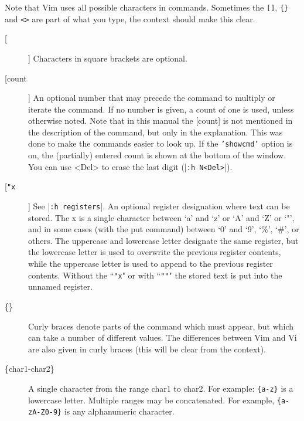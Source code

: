 Note that Vim uses all possible characters in commands.
Sometimes the \texttt{[]}, \texttt{\{\}} and \texttt{<>} are part of what you type, the context should make this clear.

\begin{description}
				\item[[]]
								Characters in square brackets are optional.

				\item[[count]]
								\label{count} \label{[count]}
								An optional number that may precede the command to multiply or iterate the command.
								If no number is given, a count of one is used, unless otherwise noted.
								Note that in this manual the [count] is not mentioned in the description of the command, but only in the explanation.
								This was done to make the commands easier to look up.
								If the \texttt{'showcmd'} option is on, the (partially) entered count is shown at the bottom of the window.
								You can use <Del> to erase the last digit (|\texttt{:h N<Del>}|).

				\item[[\texttt{"x}]]
								\label{[quotex]}
								See |\texttt{:h registers}|.
								An optional register designation where text can be stored.
								The x is a single character between `a' and `z' or `A' and `Z' or `"', and in some cases (with the put command) between `0' and `9', `\%', `\#', or others.
								The uppercase and lowercase letter designate the same register, but the lowercase letter is used to overwrite the previous register contents, while the uppercase letter is used to append to the previous register contents.
								Without the ``\texttt{"x}" or with ``\texttt{""}" the stored text is put into the unnamed register.

				\item[\{\}]
								\label{{}}
								Curly braces denote parts of the command which must appear, but which can take a number of different values.
								The differences between Vim and Vi are also given in curly braces (this will be clear from the context).

				\item[\{char1-char2\}]
								\label{{char1-char2}}
								A single character from the range char1 to char2.
								For example: \texttt{\{a-z\}} is a lowercase letter.
								Multiple ranges may be concatenated.
								For example, \texttt{\{a-zA-Z0-9\}} is any alphanumeric character.


\end{description}

